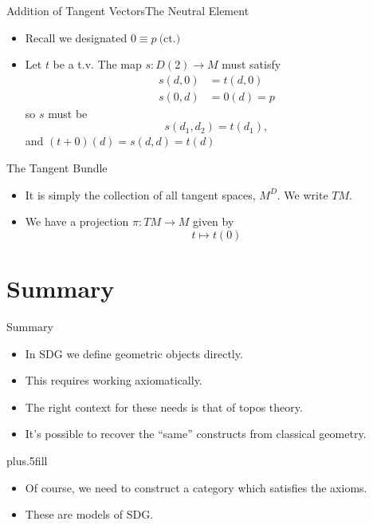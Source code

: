 \documentclass{beamer}
\begin{document}

\begin{frame}{Addition of Tangent Vectors}{The Neutral Element}
  \begin{itemize}
    \item Recall we designated \( 0\equiv p\ \text{(ct.)} \)
    \item Let \( t \) be a t.v. The map \( s:D(2)\to M \) must satisfy
      \begin{align*}
        s(d,0) &= t(d,0)\\
        s(0,d) &= 0(d) = p
      \end{align*}
      so \( s \) must be
      \begin{equation*}
        s(d_1,d_2) = t(d_1),
      \end{equation*}
      and \( (t + 0)(d) = s(d,d) = t(d) \)
  \end{itemize}
\end{frame}

\begin{frame}{The Tangent Bundle}
  \begin{itemize}
    \item It is simply the collection of all tangent spaces, \( M^D \). We write \( TM \).
    \item We have a projection \( \pi:TM\to M \) given by
      \begin{equation*}
        t\mapsto t(0)
      \end{equation*}
  \end{itemize}
\end{frame}



\section*{Summary}

\begin{frame}{Summary}

  \begin{itemize}
  \item
    In SDG we define geometric objects directly.
  \item
    This requires working axiomatically.
  \item
    The right context for these needs is that of topos theory.
  \item 
    It's possible to recover the ``same'' constructs from classical geometry.
  \end{itemize}
  
  \vskip0pt plus.5fill
  \pause
  \begin{itemize}
    \item Of course, we need to construct a category which satisfies the axioms.
    \item These are \alert{models} of SDG.
  \end{itemize}
\end{frame}
\end{document}
